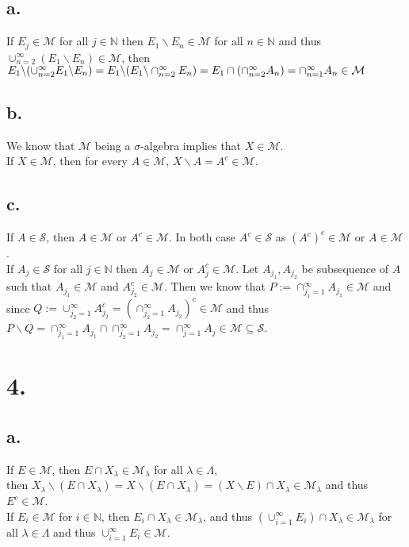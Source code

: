 \documentclass[11pt]{article}
\theoremstyle{mystyle}
\theoremstyle{definition}
\begin{document}
\subsection*{a.}
If $E_j \in \mathcal{M}$ for all $j \in \mathbb{N}$ then $E_1 \backslash E_n \in \mathcal{M}$ for all $n \in \mathbb{N}$ and thus $\cup_{n=2}^\infty (E_1 \backslash E_n) \in \mathcal{M}$, then $E_1 \backslash (\cup_{n=2}^\infty E_1 \backslash E_n) = E_1 \backslash (E_1 \backslash \cap_{n=2}^\infty E_n) =\\ E_1 \cap (\cap_{n=2}^\infty A_n) = \cap_{n=1}^\infty A_n \in \mathcal{M}$
\subsection*{b.}
We know that $\mathcal{M}$ being a $\sigma$-algebra implies that $X \in \mathcal{M}$. \\
If $X \in \mathcal{M}$, then for every $A \in \mathcal{M}$, $X \backslash A = A^c \in \mathcal{M}$. 
\subsection*{c.}
If $A \in \mathcal{S}$, then $A \in \mathcal{M}$ or $A^c \in \mathcal{M}$. In both case $A^c \in \mathcal{S}$ as $(A^c)^c \in \mathcal{M}$ or $A \in \mathcal{M}$. \\
If $A_j \in \mathcal{S}$ for all $j \in \mathbb{N}$ then $A_j \in \mathcal{M}$ or $A_j^c \in \mathcal{M}$. Let $A_{j_1}, A_{j_2}$ be subsequence of $A$ such that $A_{j_1} \in \mathcal{M}$ and $A_{j_2}^c \in \mathcal{M}$. Then we know that $P:= \cap_{j_1 = 1}^\infty A_{j_1} \in \mathcal{M}$ and since $Q := \cup_{j_2=1}^\infty A_{j_2}^c = (\cap_{j_2=1}^\infty A_{j_2})^c \in \mathcal{M}$ and thus $P\backslash Q = \cap_{j_1=1}^\infty A_{j_1} \cap \cap_{j_2=1}^\infty A_{j_2} = \cap_{j=1}^\infty A_j \in \mathcal{M} \subseteq \mathcal{S}$. 
\newpage
\section*{4.}
\subsection*{a.}
If $E \in \mathcal{M}$, then $E \cap X_\lambda \in \mathcal{M}_\lambda$ for all $\lambda \in \Lambda$, \\
then $X_\lambda \backslash (E \cap X_\lambda) = X\backslash (E \cap X_\lambda) = (X\backslash E)\cap X_\lambda  \in \mathcal{M}_\lambda$ and thus $E^c \in \mathcal{M}$. \\ 
If $E_i \in \mathcal{M}$ for $i \in \mathbb{N}$, then $E_i \cap X_\lambda \in \mathcal{M}_\lambda$, and thus $(\cup_{i=1}^\infty E_i )\cap X_\lambda \in \mathcal{M}_\lambda$ for all $\lambda \in \Lambda$ and thus $\cup_{i=1}^\infty E_i \in \mathcal{M}$. 
\end{document}
